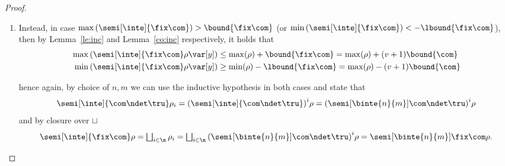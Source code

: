 \begin{proof}
\begin{enumerate}[label=(\roman*)]
\begin{enumerate}[label=(\alph*)]
    \item  Instead, in case
      \(\max\left(\semi[\inte]{\fix\com}\right) > \bound{\fix\com}\) (or
      \(\min\left(\semi[\inte]{\fix\com}\right) < -\lbound{\fix\com}\)),
      then by Lemma~\ref{le:inc} and Lemma~\ref{co:inc} respectively, it
      holds that
      \begin{align*}
        \max\left(\semi[\inte]{\fix\com}\rho\var[y]\right) & \leq \max(\rho) + \bound{\fix\com} = \max(\rho) + (v + 1)\bound{\com} \\
        \min\left(\semi[\inte]{\fix\com}\rho\var[y]\right) & \geq \min(\rho) - \lbound{\fix\com} = \max(\rho) - (v + 1)\bound{\com} 
      \end{align*}
      
      hence again, by choice of \(n,m\) we can use the inductive
      hypothesis in both cases and state that
      \begin{equation*}
        \semi[\inte]{\com \ndet \tru}\rho_i
        =
        {\left(\semi[\inte]{\com\ndet\tru}\right)}^i\rho
        =
        {\left(\semi[\binte{n}{m}]{\com\ndet\tru}\right)}^i\rho
      \end{equation*}
      and by closure over \(\sqcup\)
      \begin{equation*}
        \semi[\inte]{\fix\com}\rho
        =
        \textstyle\bigsqcup_{i\in\n}\rho_i
        =
        \textstyle\bigsqcup_{i\in\n}{\left(\semi[\binte{n}{m}]{\com\ndet\tru}\right)}^i\rho
        =
        \semi[\binte{n}{m}]{\fix\com}\rho.
      \end{equation*}
    \end{enumerate}
  \end{enumerate}
\end{proof}

